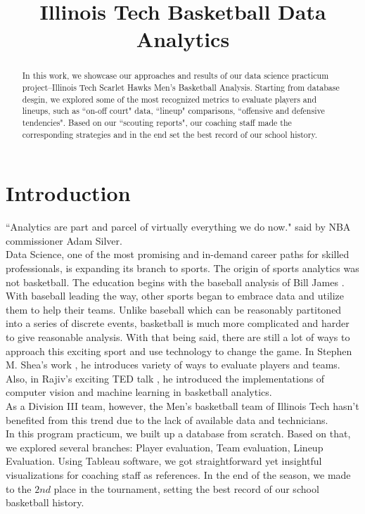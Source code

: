 \documentclass[conference]{IEEEtran}
\begin{document}
\title{Illinois Tech Basketball Data Analytics}
\author 
{
}
\maketitle

\begin{abstract}
In this work, we showcase our approaches and results of our data science practicum project--Illinois Tech Scarlet Hawks Men's Basketball Analysis. Starting from database desgin, we explored some of the most recognized metrics to evaluate players and lineups, such as ``on-off court" data, ``lineup" comparisons, ``offensive and defensive tendencies". Based on our ``scouting reports", our coaching staff made the corresponding strategies and in the end set the best record of our school history.
\end{abstract}

\section{Introduction}

``Analytics are part and parcel of virtually everything we do now." said by NBA commissioner Adam Silver. \\
Data Science, one of the most promising and in-demand career paths for skilled professionals, is expanding its branch to sports. The origin of sports analytics was not basketball. The education begins with the baseball analysis of Bill James \cite{james2010new}. With baseball leading the way, other sports began to embrace data and utilize them to help their teams. Unlike baseball which can be reasonably partitoned into a series of discrete events, basketball is much more complicated and harder to give reasonable analysis. With that being said, there are still a lot of ways to approach this exciting sport and use technology to change the game. In Stephen M. Shea's work \cite{1492923176}, he introduces variety of ways to evaluate players and teams. Also, in  Rajiv's exciting TED talk \cite{tedtalk}, he introduced the implementations of computer vision and machine learning in basketball analytics.\\
As a Division III team, however, the Men's basketball team of Illinois Tech hasn't benefited from this trend due to the lack of available data and technicians.\\
In this program practicum, we built up a database from scratch. Based on that, we explored several branches: Player evaluation, Team evaluation, Lineup Evaluation. Using Tableau software, we got straightforward yet insightful visualizations for coaching staff as references. In the end of the season, we made to the $2nd$ place in the tournament, setting the best record of our school basketball history.
\end{document}
